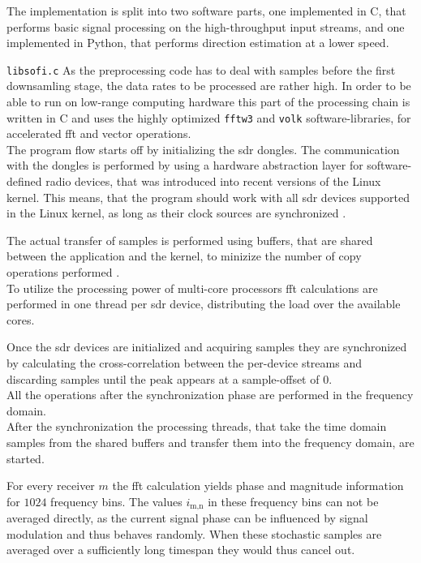 The implementation is split into two software parts,
one implemented in C, that performs basic signal
processing on the high-throughput input streams, and
one implemented in Python, that performs direction estimation
at a lower speed.

\begin{subchapter}{\texttt{libsofi.c}}
  As the preprocessing code has to deal with samples
  before the first downsamling stage, the data rates to be
  processed are rather high.
  In order to be able to run on low-range computing hardware
  this part of the processing chain is written in C and
  uses the highly optimized \texttt{fftw3} and \texttt{volk}
  software-libraries, for accelerated \gls{fft} and vector operations. \\

  The program flow starts off by initializing the \gls{sdr}
  dongles. The communication with the dongles is performed
  by using a hardware abstraction layer for software-defined radio
  devices, that was introduced into recent versions of
  the Linux kernel. This means, that the program should work
  with all \gls{sdr} devices supported in the Linux kernel,
  as long as their clock sources are synchronized \cite{v4lsdr}.

  The actual transfer of samples is performed using
  buffers, that are shared between the application and
  the kernel, to minizize the number of
  copy operations performed \cite{v4lmmap}. \\

  To utilize the processing power of multi-core processors
  \gls{fft} calculations are performed in one thread per
  \gls{sdr} device, distributing the load over the available cores.

  Once the \gls{sdr} devices are initialized and acquiring samples
  they are synchronized by calculating the
  cross-correlation between the per-device streams
  and discarding samples until the peak appears at a
  sample-offset of $0$. \\

  All the operations after the synchronization phase are
  performed in the frequency domain. \\

  After the synchronization the processing threads, that
  take the time domain samples from the shared buffers and transfer
  them into the frequency domain, are started.

  For every receiver $m$ the \gls{fft} calculation yields phase
  and magnitude information for $1024$ frequency bins.
  The values $i_\text{m,n}$ in these frequency bins can not
  be averaged directly, as the current signal phase can be
  influenced by signal modulation and thus behaves randomly.
  When these stochastic samples are averaged over a sufficiently long
  timespan they would thus cancel out. \\


\end{subchapter}

